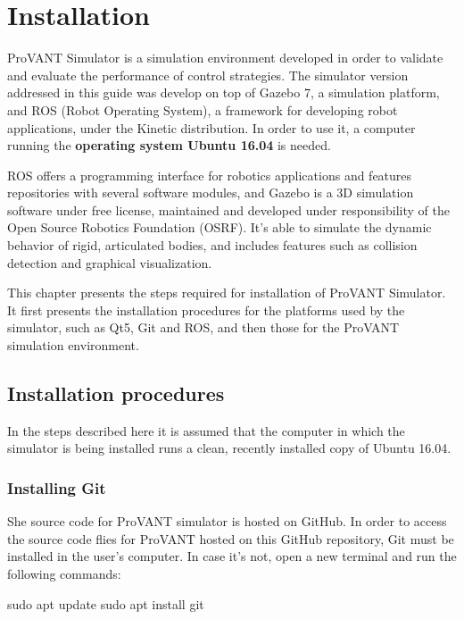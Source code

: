 \chapter{Installation}

ProVANT Simulator is a simulation environment developed in order to validate and evaluate the performance of control strategies. The simulator version addressed in this guide was develop on top of Gazebo 7, a simulation platform, and ROS (Robot Operating System), a framework for developing robot applications, under the Kinetic distribution. In order to use it, a computer running the \textbf{operating system Ubuntu 16.04} is needed.

ROS offers a programming interface for robotics applications and features repositories with several software modules, and Gazebo is a 3D simulation software under free license, maintained and developed under responsibility of the Open Source Robotics Foundation (OSRF). It's able to simulate the dynamic behavior of rigid, articulated bodies, and includes features such as collision detection and graphical visualization.

This chapter presents the steps required for installation of ProVANT Simulator. It first presents the installation procedures for the platforms used by the simulator, such as Qt5, Git and ROS, and then those for the ProVANT simulation environment.

\section{Installation procedures}

In the steps described here it is assumed that the computer in which the simulator is being installed runs a clean, recently installed copy of Ubuntu 16.04.

\subsection{Installing Git}

She source code for ProVANT simulator is hosted on GitHub. In order to access the source code flies for ProVANT hosted on this GitHub repository, Git must be installed in the user's computer. In case it's not, open a new terminal and run the following commands:

\begin{bashcode}
sudo apt update
sudo apt install git
\end{bashcode}

